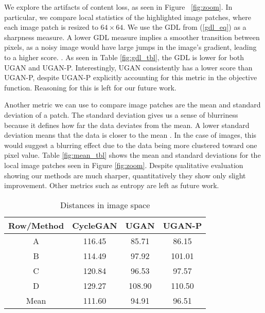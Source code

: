 We explore the artifacts of content loss, as seen in Figure ~\ref{fig:zoom}. In particular, we compare local statistics
of the highlighted image patches, where each image patch is resized to $64 \times 64$. We use the GDL
\cite{mathieu2015deep} from (\ref{gdl_eq}) as a sharpness measure. A lower GDL measure implies a smoother transition
between pixels, as a noisy image would have large jumps in the image's gradient, leading to a higher score. .
As seen in Table \ref{fig:gdl_tbl}, the GDL is lower for both UGAN and UGAN-P. Interestingly, UGAN consistently has a
lower score than UGAN-P, despite UGAN-P explicitly accounting for this metric in the objective function. Reasoning for
this is left for our future work.

Another metric we can use to compare image patches are the mean and standard deviation of a patch. The standard
deviation gives us a sense of blurriness because it defines how far the data deviates from the mean. A lower standard
deviation means that the data is closer to the mean . In the case of images, this would suggest a blurring effect due to the data being
more clustered toward one pixel value. Table \ref{fig:mean_tbl} shows the mean and standard deviations for the local
image patches seen in Figure \ref{fig:zoom}. Despite qualitative evaluation showing our methods are much sharper,
quantitatively they show only slight improvement. Other metrics such as entropy are left as future work.

\begin{table}
\centering
\caption{Distances in image space}
\begin{tabular}{| c | c | c | c |}
   \hline
   Row/Method & CycleGAN & \textbf{UGAN} & \textbf{UGAN-P} \\ \hline
   A          & 116.45 & 85.71  & 86.15  \\ \hline
   B          & 114.49 & 97.92  & 101.01 \\ \hline
   C          & 120.84 & 96.53  & 97.57  \\ \hline
   D          & 129.27 & 108.90 & 110.50 \\ \hline
   Mean       & 111.60 & 94.91  & 96.51 \\ \hline
\end{tabular}
\end{table}

